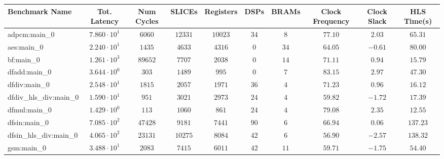 \begin{tabular}{|l|c|c|c|c|c|c|c|c|c|}
\hline
Benchmark Name          & Tot. Latency           & Num Cycles & SLICEs    & Registers & DSPs    & BRAMs   & Clock Frequency & Clock Slack & HLS Time(s) \\
\hline
adpcm:main\_0           & $ 7.860 \cdot 10^{1} $ & $ 6060   $ & $ 12331 $ & $ 10023 $ & $ 34  $ & $ 8   $ & $ 77.10       $ & $ 2.03    $ & $ 65.31   $ \\
aes:main\_0             & $ 2.240 \cdot 10^{1} $ & $ 1435   $ & $ 4633  $ & $ 4316  $ & $ 0   $ & $ 34  $ & $ 64.05       $ & $ -0.61   $ & $ 80.00   $ \\
bf:main\_0              & $ 1.261 \cdot 10^{3} $ & $ 89652  $ & $ 7707  $ & $ 2038  $ & $ 0   $ & $ 14  $ & $ 71.11       $ & $ 0.94    $ & $ 15.79   $ \\
dfadd:main\_0           & $ 3.644 \cdot 10^{0} $ & $ 303    $ & $ 1489  $ & $ 995   $ & $ 0   $ & $ 7   $ & $ 83.15       $ & $ 2.97    $ & $ 47.30   $ \\
dfdiv:main\_0           & $ 2.548 \cdot 10^{1} $ & $ 1815   $ & $ 2057  $ & $ 1971  $ & $ 36  $ & $ 4   $ & $ 71.23       $ & $ 0.96    $ & $ 16.12   $ \\
dfdiv\_hls\_div:main\_0 & $ 1.590 \cdot 10^{1} $ & $ 951    $ & $ 3021  $ & $ 2973  $ & $ 24  $ & $ 4   $ & $ 59.82       $ & $ -1.72   $ & $ 17.39   $ \\
dfmul:main\_0           & $ 1.429 \cdot 10^{0} $ & $ 113    $ & $ 1060  $ & $ 861   $ & $ 24  $ & $ 4   $ & $ 79.08       $ & $ 2.35    $ & $ 12.55   $ \\
dfsin:main\_0           & $ 7.085 \cdot 10^{2} $ & $ 47428  $ & $ 9181  $ & $ 7441  $ & $ 90  $ & $ 6   $ & $ 66.94       $ & $ 0.06    $ & $ 137.23  $ \\
dfsin\_hls\_div:main\_0 & $ 4.065 \cdot 10^{2} $ & $ 23131  $ & $ 10275 $ & $ 8084  $ & $ 42  $ & $ 6   $ & $ 56.90       $ & $ -2.57   $ & $ 138.32  $ \\
gsm:main\_0             & $ 3.488 \cdot 10^{1} $ & $ 2083   $ & $ 7415  $ & $ 6011  $ & $ 42  $ & $ 11  $ & $ 59.71       $ & $ -1.75   $ & $ 54.40   $ \\

\end{tabular}
